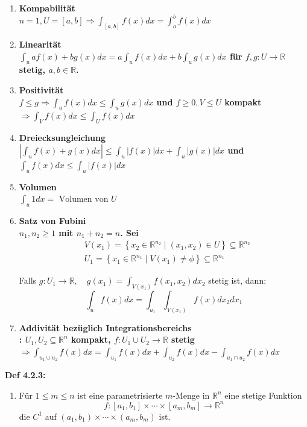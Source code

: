 \documentclass[7pt,landscape, margin = 0.1mm]{article}
\newcommand{\COL}[1]{ \color{chaptercolor} \bf{#1}\color{black}     \\}
\newcommand{\DEF}[2]{\color{chaptercolor}\bf{Def #1}:\color{black}    \hspace{0.2cm} #2 \\}
\begin{document}
\begin{multicols}{4}
\begin{flushleft}
{\begin{enumerate}
\item \COL{Kompabilität} $n=1, U=[a, b] \Rightarrow \int_{[a, b]} f(x) d x=\int_a^b f(x) d x$
\item \COL{Linearität}  $\int_u a f(x)+b g(x) d x=a \int_u f(x) d x+b \int_u g(x) d x$ für $f, g: U \rightarrow \mathbb{R}$ stetig, $a, b \in \mathbb{R}$.
\item \COL{Positivität} $f \leqslant g \Rightarrow \int_u f(x) d x \leq \int_u g(x) d x$ und $f \geqslant 0, V \leq U$ kompakt $\Rightarrow \int_V f(x) d x \leq \int_U f(x) d x$
\item \COL{Dreiecksungleichung} $\left|\int_u f(x)+g(x) d x\right| \leq \int_u|f(x)| d x+\int_u|g(x)| d x$ und $\int_u f(x) d x \leqslant \int_u|f(x)| d x$	
\item \COL{Volumen} $\int_u 1 d x=\text { Volumen von } U$
\item \COL{Satz von Fubini} $n_1, n_2 \geqslant 1$ mit $n_1+n_2=n$. Sei
	$$
	\begin{aligned}
	& V\left(x_1\right)=\left\{x_2 \in \mathbb{R}^{n_2} \mid\left(x_1, x_2\right) \in U\right\} \subseteq \mathbb{R}^{n_2} \\
	& U_1=\left\{x_1 \in \mathbb{R}^{n_1} \mid V\left(x_1\right) \neq \phi\right\} \subseteq \mathbb{R}^{n_1}
	\end{aligned}
	$$
	
	Falls $g: U_1 \rightarrow \mathbb{R}, \quad g\left(x_1\right)=\int_{V\left(x_1\right)} f\left(x_1, x_2\right) d x_2$ stetig ist, dann:
	$$
	\int_u f(x) d x=\int_{u_1} \int_{V\left(x_1\right)} f(x) d x_2 d x_1
	$$
	
\item \COL{Addivität bezüglich Integrationsbereichs}: $U_1, U_2 \subseteq \mathbb{R}^n$ kompakt, $f: U_1 \cup U_2 \rightarrow \mathbb{R}$ stetig
	$
\Rightarrow \int_{u_1 \cup u_2} f(x) d x=\int_{u_1} f(x) d x+\int_{u_2} f(x) d x-\int_{u_1 \cap u_2} f(x) d x
$


\end{enumerate}



}

\DEF{4.2.3}{
\begin{enumerate}


\item  Für $1 \leqslant m \leqslant n$ ist eine parametrisierte $m$-Menge in $\mathbb{R}^n$ eine stetige Funktion
 $$
 f:\left[a_1, b_1\right] \times \cdots \times\left[a_m, b_m\right] \rightarrow \mathbb{R}^n
 $$
die $C^1$ auf $\left(a_1, b_1\right) \times \cdots \times\left(a_m, b_m\right)$ ist.
 

\end{enumerate}}
\end{flushleft}
\end{multicols}
\end{document}
